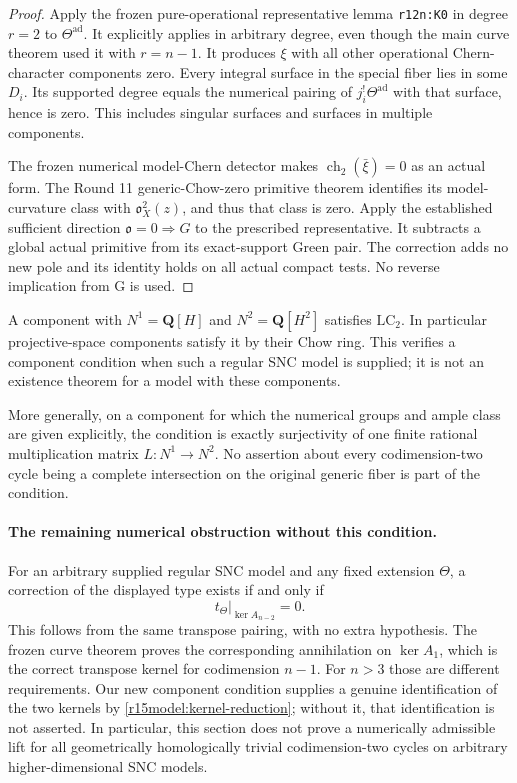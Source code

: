 \begin{proof}
Apply the frozen pure-operational representative lemma
\texttt{r12n:K0} in degree $r=2$ to $\Theta^{\mathrm{ad}}$.
It explicitly applies in arbitrary degree, even though the main
curve theorem used it with $r=n-1$.
It produces $\xi$ with all other operational Chern-character
components zero.  Every integral surface in the special fiber
lies in some $D_i$.  Its supported degree equals the numerical
pairing of $j_i^!\Theta^{\mathrm{ad}}$ with that surface, hence
is zero.  This includes singular surfaces and surfaces in
multiple components.

The frozen numerical model-Chern detector makes
$\operatorname{ch}_2(\bar\xi)=0$ as an actual form.  The
Round 11 generic-Chow-zero primitive theorem identifies its
model-curvature class with $\mathfrak o_X^2(z)$, and thus that
class is zero.  Apply the established sufficient direction
$\mathfrak o=0\Rightarrow G$ to the prescribed representative.
It subtracts a global actual primitive from its exact-support
Green pair.  The correction adds no new pole and its identity
holds on all actual compact tests.  No reverse implication from
G is used.
\end{proof}

\begin{remark}
\label{r15model:examples}
A component with $N^1=\mathbf Q[H]$ and
$N^2=\mathbf Q[H^2]$ satisfies $\mathrm{LC}_2$.
In particular projective-space components satisfy it by their
Chow ring.  This verifies a component condition when such a
regular SNC model is supplied; it is not an existence theorem
for a model with these components.

More generally, on a component for which the numerical groups
and ample class are given explicitly, the condition is exactly
surjectivity of one finite rational multiplication matrix
$L:N^1\to N^2$.  No assertion about every codimension-two cycle
being a complete intersection on the original generic fiber
is part of the condition.
\end{remark}

\paragraph{The remaining numerical obstruction without this condition.}
For an arbitrary supplied regular SNC model and any fixed extension
$\Theta$, a correction of the displayed type exists if and only if
\[
           t_\Theta|_{\ker A_{n-2}}=0.
\tag{LW15.10}\label{r15model:exact-numerical-gate}
\]
This follows from the same transpose pairing, with no extra
hypothesis.  The frozen curve theorem proves the corresponding
annihilation on $\ker A_1$, which is the correct transpose
kernel for codimension $n-1$.  For $n>3$ those are different
requirements.  Our new component condition supplies a genuine
identification of the two kernels by \eqref{r15model:kernel-reduction};
without it, that identification is not asserted.  In particular,
this section does not prove a numerically admissible lift for all
geometrically homologically trivial codimension-two cycles on
arbitrary higher-dimensional SNC models.

